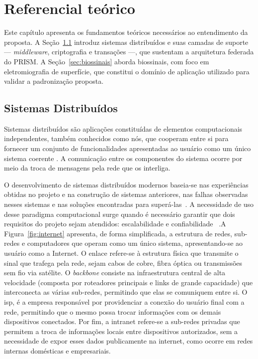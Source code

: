 \chapter{Referencial te\'orico}\label{cap:referencialTeorico}

Este capítulo apresenta os fundamentos teóricos necessários ao entendimento da proposta. A Seção~\ref{sec:sistemasDistribuidos} introduz sistemas distribuídos e suas camadas de suporte --- \textit{middleware}, criptografia e transações ---, que sustentam a arquitetura federada do PRISM. A Seção~\ref{sec:biossinais} aborda biossinais, com foco em eletromiografia de superfície, que constitui o domínio de aplicação utilizado para validar a padronização proposta.

\section{Sistemas Distribu\'idos}\label{sec:sistemasDistribuidos}

Sistemas distribuídos são aplicações constituídas de elementos computacionais independentes, também conhecidos como nós, que cooperam entre si para fornecer um conjunto de funcionalidades apresentadas ao usuário como um único sistema coerente \cite{van2025distributed}. A comunicação entre os componentes do sistema ocorre por meio da troca de mensagens pela rede que os interliga.

O desenvolvimento de sistemas distribuídos modernos baseia-se nas experiências obtidas no projeto e na construção de sistemas anteriores, nas falhas observadas nesses sistemas e nas soluções encontradas para superá-las~\cite{burns2024designing}. A necessidade de uso desse paradigma computacional surge quando é necessário garantir que dois requisitos do projeto sejam atendidos: escalabilidade e confiabilidade ~\cite{Coulouris2013}.A Figura~\ref{fig:internet} apresenta, de forma simplificada, a estrutura de redes, sub-redes e computadores que operam como um único sistema, apresentando-se ao usuário como a Internet. O enlace refere-se à estrutura física que transmite o sinal que trafega pela rede, sejam cabos de cobre, fibra óptica ou transmissões sem fio via satélite. O \textit{backbone} consiste na infraestrutura central de alta velocidade (composta por roteadores principais e links de grande capacidade) que interconecta as várias sub-redes, permitindo que elas se comuniquem entre si. O \gls{isp}, é a empresa responsável por providenciar a conexão do usuário final com a rede, permitindo que o mesmo possa trocar informações com os demais dispositivos conectados. Por fim, a intranet refere-se a sub-redes privadas que permitem a troca de informações locais entre dispositivos autorizados, sem a necessidade de expor esses dados publicamente na internet, como ocorre em redes internas domésticas e empresariais.

